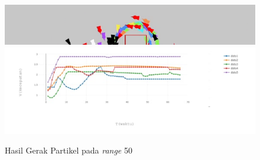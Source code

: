 \begin{figure}
\centering
\includegraphics[scale=0.6]{gambar/hasilntukdibandingkankim2.PNG}
\includegraphics[scale=0.9]{gambar/datagrafik/range50heterogen}
\caption{Hasil Gerak Partikel pada \textit{range} 50}
\label{fig:dominanrange50}
\end{figure}

